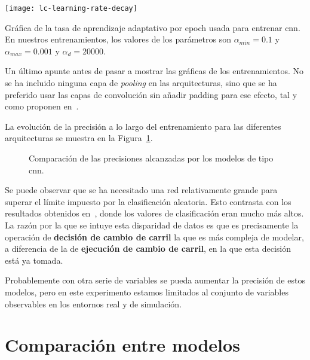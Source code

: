 \begin{marginfigure}
	\centering
	\texttt{[image: lc-learning-rate-decay]}
	\caption[Gráfica de la tasa de aprendizaje adaptativo por epoch usada para entrenar \ac{cnn}]{Gráfica de la tasa de aprendizaje adaptativo por epoch usada para entrenar \ac{cnn}. En nuestros entrenamientos, los valores de los parámetros son $\alpha_{min} = 0.1$ y $\alpha_{max} = 0.001$ y $\alpha_d = 20000$.}
	\label{fig:learning-rate-decay}
\end{marginfigure}

Un último apunte antes de pasar a mostrar las gráficas de los entrenamientos. No se ha incluido ninguna capa de \textit{pooling} en las arquitecturas, sino que se ha preferido usar las capas de convolución sin añadir padding para ese efecto, tal y como proponen en~\cite{howard2017mobilenets}.

La evolución de la precisión a lo largo del entrenamiento para las diferentes arquitecturas se muestra en la Figura~\ref{fig:lc-cnn-training-validation-test-comparison}.

\begin{figure}[b]
	\centering
	\qquad
	\caption[Comparación de las precisiones alcanzadas por los modelos de tipo \ac{mlp}]{Comparación de las precisiones alcanzadas por los modelos de tipo \ac{cnn}.}
	\label{fig:lc-cnn-training-validation-test-comparison}
\end{figure}

Se puede observar que se ha necesitado una red relativamente grande para superar el límite impuesto por la clasificación aleatoria. Esto contrasta con los resultados obtenidos en~\cite{EL PAPER PARA CUANDO NOS LO PUBLIQUEN}, donde los valores de clasificación eran mucho más altos. La razón por la que se intuye esta disparidad de datos es que es precisamente la operación de \textbf{decisión de cambio de carril} la que es más compleja de modelar, a diferencia de la de \textbf{ejecución de cambio de carril}, en la que esta decisión está ya tomada.

Probablemente con otra serie de variables se pueda aumentar la precisión de estos modelos, pero en este experimento estamos limitados al conjunto de variables observables en los entornos real y de simulación.

\section{Comparación entre modelos}

